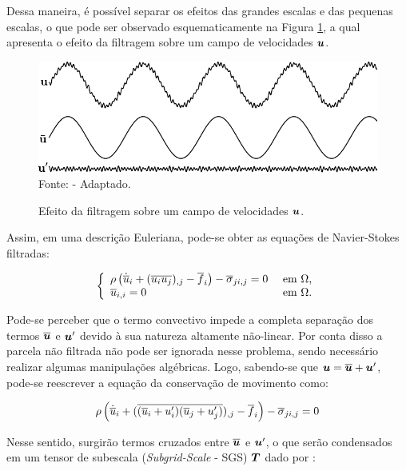 Dessa maneira, é possível separar os efeitos das grandes escalas e das pequenas escalas, o que pode ser observado esquematicamente na Figura \ref{fig:EfeitoFiltragem}, a qual apresenta o efeito da filtragem sobre um campo de velocidades $\boldsymbol{u}$.

\begin{figure}[h!]
    \centering
    \caption{Efeito da filtragem sobre um campo de velocidades $\boldsymbol{u}$.}
    \includegraphics[width=.75\linewidth]{Figuras/efeito_filtragem.pdf}
    \\Fonte:  - Adaptado.
    \label{fig:EfeitoFiltragem}
\end{figure}

Assim, em uma descrição Euleriana, pode-se obter as equações de Navier-Stokes filtradas:

\begin{equation}
    \left\{
    \begin{array}{ll}
        \rho\left({\dot{\overline{u}}_i+(\overline{u_iu_j})_{,j}-\overline{f}_i}\right)-\overline{\sigma}_{ji,j}=0 & \text{ em }\Omega\text{,} \\
        \overline{u}_{i,i}=0                                                                       & \text{ em }\Omega\text{.}
    \end{array}
    \right.
\end{equation}

Pode-se perceber que o termo convectivo impede a completa separação dos termos $\overline{\boldsymbol{u}}$ e $\boldsymbol{u}'$ devido à sua natureza altamente não-linear. Por conta disso a parcela não filtrada não pode ser ignorada nesse problema, sendo necessário realizar algumas manipulações algébricas. Logo, sabendo-se que $\boldsymbol{u}=\overline{\boldsymbol{u}}+\boldsymbol{u}'$, pode-se reescrever a equação da conservação de movimento como:

\begin{equation}
    \rho\left({\dot{\overline{u}}_i+(\overline{(\overline{u}_i+u'_i)(\overline{u}_j+u'_j)})_{,j}-\overline{f}_i}\right)-\overline{\sigma}_{ji,j}=0
\end{equation}

Nesse sentido, surgirão termos cruzados entre $\overline{\boldsymbol{u}}$ e $\boldsymbol{u}'$, o que serão condensados em um tensor de subescala (\textit{Subgrid-Scale} - SGS) $\boldsymbol{T}$ dado por \cite{piomelli1999large,hughes2000large}:


